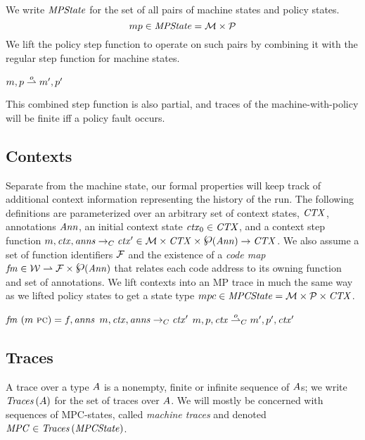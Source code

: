\documentclass[acmsmall,review,anonymous]{acmart}\settopmatter{printfolios=true,printccs=false,printacmref=false}
\newcommand{\powerset}{\raisebox{.15\baselineskip}{\Large\ensuremath{\wp}}}
\begin{document}
We write $\MPS$ for the set of all pairs of machine states and policy
states.
%
\[\mpstatename \in \MPS = \MACHS \times \POLS\]
%
We lift the policy step function to operate on such pairs
by combining it with the regular step function for machine states.

            {\(\mpstate{\mach}{\pol} \stepstopol[\obs]
               \mpstate{\mach'}{\pol'}\)}

\noindent
This combined step function is also partial, and traces of the machine-with-policy
will be finite iff a policy fault occurs.

\subsection{Contexts}

Separate from the machine state, our formal properties will keep track of additional context
information representing the history of the run. The following definitions are parameterized
over an arbitrary set of context states, \(\CONTEXTS\), annotations \(\ANNS\),
an initial context state \(\context_0 \in \CONTEXTS\), and a context step function
\(\mach, \context, \anns \constep \context' \in \MACHS \times \CONTEXTS
\times \powerset(\ANNS) \rightarrow \CONTEXTS\). We also assume a set of function identifiers
\(\FUNIDS\) and the existence of a \emph{code map} \(\codemap \in \WORDS \rightharpoonup \FUNIDS \times \powerset(\ANNS)\)
that relates each code address to its owning function and set of annotations.
We lift contexts into an MP trace in much the same way as we lifted policy states to get
a state type \(\mpcstatename \in \MPCS = \MACHS \times \POLS \times
\CONTEXTS\).  

              {\(\codemap ~ (\mach ~ \PCname) = \funid, \anns\)}
              {\(\mach, \context, \anns \constep \context'\)}
              {\(\mpcstate{\mach}{\pol}{\context} \stepstocon[\obs]
                \mpcstate{\mach'}{\pol'}{\context'}\)}

\subsection{Traces}
\label{sec:traces}

A trace over a type \(\TRACEELEMS\) is a nonempty, finite or infinite sequence of
\(\TRACEELEMS\)s; we write \(\TRACE{\TRACEELEMS}\) for the set of traces over
\(\TRACEELEMS\). We will mostly be concerned with sequences of MPC-states,
called \emph{machine traces} and denoted \(\MPCT \in \TRACE{\MPCS}\). %
\end{document}
